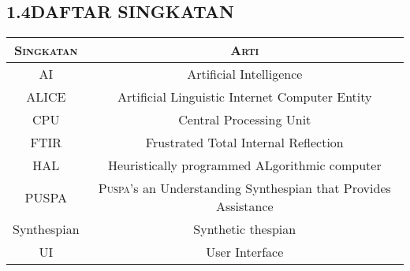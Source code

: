 \subsection*{\textsf{\normalsize 1.4\hspace{0.5cm}DAFTAR SINGKATAN}}
\begin{tabular}{|c|c|}
\hline
{\scshape Singkatan} & {\scshape Arti}\\
\hline
AI & Artificial Intelligence\\
\hline
ALICE & Artificial Linguistic Internet Computer Entity\\
\hline
CPU & Central Processing Unit\\
\hline
FTIR & Frustrated Total Internal Reflection\\
\hline
HAL & Heuristically programmed ALgorithmic computer\\
\hline
PUSPA & {\scshape Puspa}'s an Understanding Synthespian that Provides Assistance\\
\hline
Synthespian & Synthetic thespian\\
\hline
UI & User Interface\\
\hline
\end{tabular}
